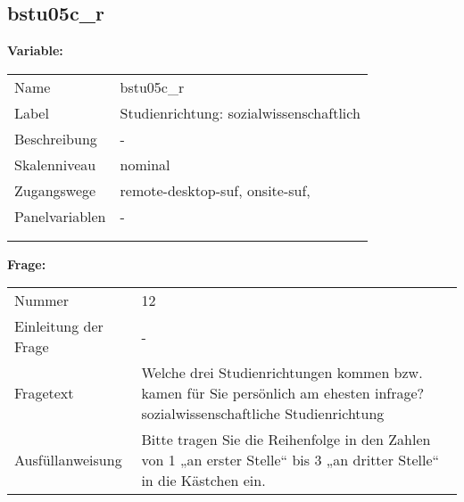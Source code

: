 	
	
	\subsection{bstu05c\_r}
	\label{subSection:bstu05c_r}

	\noindent\textbf{Variable:}\\
		\begin{tabular}{lL{11.3cm}}
			\label{tableVariable:bstu05c_r}
			Name & bstu05c\_r \\
			Label & Studienrichtung: sozialwissenschaftlich \\
			Beschreibung & - \\
			Skalenniveau & nominal \\
			Zugangswege &
				remote-desktop-suf,
				onsite-suf,
 \\
			Panelvariablen & -
			 \\
			 \\
 \\
		\end{tabular}

		\vspace*{1 cm}
		\noindent\textbf{Frage:}\\
		\begin{tabular}{lL{11.3cm}}
			\label{tableQuestion:bstu05c_r}
			Nummer & 12 \\
			Einleitung der Frage & - \\
			Fragetext & Welche drei Studienrichtungen kommen bzw. kamen für Sie persönlich am ehesten infrage?
sozialwissenschaftliche Studienrichtung \\
			Ausfüllanweisung & Bitte tragen Sie die Reihenfolge in den Zahlen von 1 „an erster Stelle“ bis 3 „an dritter Stelle“ in die Kästchen ein. \\
		\end{tabular}





